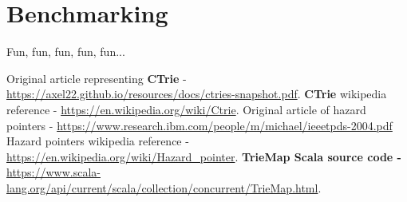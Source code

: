 \documentclass[conference]{IEEEtran}
\begin{document}
\section{Benchmarking}
	Fun, fun, fun, fun, fun...

\begin{thebibliography}{1}

	 Original article representing \textbf{CTrie} - \url{https://axel22.github.io/resources/docs/ctries-snapshot.pdf}. 
	 \textbf{CTrie} wikipedia reference - \url{https://en.wikipedia.org/wiki/Ctrie}.
	 Original article of hazard pointers - 
	\url{https://www.research.ibm.com/people/m/michael/ieeetpds-2004.pdf}
	 Hazard pointers wikipedia reference - \url{https://en.wikipedia.org/wiki/Hazard_pointer}.
	 \textbf{TrieMap Scala source code - } \url{https://www.scala-lang.org/api/current/scala/collection/concurrent/TrieMap.html}.
\end{thebibliography}

\end{document}
